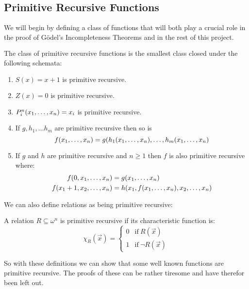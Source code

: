 \documentclass[../main.tex]{subfiles}
\begin{document}
\subsection{Primitive Recursive Functions}
We will begin by defining a class of functions that will both play a crucial
role in the proof of Gödel's Incompleteness Theorems and in the rest of this
project. 
\begin{defi}
	\label{def:Recur}
	The class of primitive recursive functions is the smallest class closed
	under the following schemata:
	\begin{enumerate}[label=\Roman*.]
		\item $S(x)=x+1$ is primitive recursive.
		\item $Z(x)=0$ is primitive recursive.
		\item $P^n_i(x_1,\ldots,x_n)=x_i$ is primitive recursive.
		\item If $g,h_1,\ldots h_m$ are primitive recursive then so
			is
			$$f(x_1,\ldots,x_n)=g(h_1(x_1,\ldots,x_n),\ldots,h_m(x_1,\ldots,x_n)$$
		\item If $g$ and $h$ are primitive recursive and $n\geq 1$ then
			$f$ is also primitive recursive where:
			\begin{align*}
				f(0,x_1,\ldots,x_n)&=g(x_1,\ldots,x_n)\\
				f(x_1+1,x_2,\ldots,x_n)&=h(x_1,f(x_1,\ldots,x_n),x_2,\ldots,x_n)
			\end{align*}
	\end{enumerate}
\end{defi}
We can also define relations as being primitive recursive:
\begin{defi}
	A relation $R\subseteq \omega^n$ is primitive recursive if its
	characteristic function is:
	\[\chi_R(\vec{x})=\begin{cases}
		0 &\text{if}\ R(\vec{x})\\
		1 &\text{if}\ \neg R(\vec x)
	\end{cases}\]
\end{defi}
So with these definitions we can show that some well known functions are
primitive recursive. The proofs of these can be rather tiresome and have
therefor been
left out.
\newpage
\end{document}
